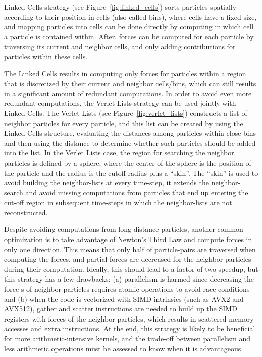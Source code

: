 \documentclass[Afour,sageh,times]{sagej}
\newcommand{\RMchange}[1]{{\color{blue} #1}}
\begin{document}
Linked Cells strategy (see Figure~\ref{fig:linked_cells}) sorts particles spatially according to their position in cells (also called bins), where cells have a fixed size, and mapping particles into cells can be done directly by computing in which cell a particle is contained within.
After, forces can be computed for each particle by traversing its current and neighbor cells, and only adding contributions for particles within these cells.

The Linked Cells results in computing only forces for particles within a region that is discretized by their current and neighbor cells/bins, which can still results in a significant amount of redundant computations.
In order to avoid even more redundant computations, the Verlet Lists strategy can be used jointly with Linked Cells.
The Verlet Lists (see Figure~\ref{fig:verlet_lists}) constructs a list of neighbor particles for every particle, and this list can be created by using the Linked Cells structure, evaluating the distances among particles within close bins and then using the distance to determine whether such particles should be added into the list.
In the Verlet Lists case, the region for searching the neighbor particles is defined by a sphere, where the center of the sphere is the position of the particle and the radius is the cutoff radius plus a ``skin''.
The ``skin'' is used to avoid building the neighbor-lists at every time-step, it extends the neighbor-search and avoid missing computations from particles that end up entering the cut-off region in subsequent time-steps in which the neighbor-lists are not reconstructed.

Despite avoiding computations from long-distance particles, another common optimization is to take advantage of Newton's Third Law and compute forces in only one direction.
This means that only half of particle-pairs are traversed when computing the forces, and partial forces are decreased for the neighbor particles during their computation.
Ideally, this should lead to a factor of two speedup, but this strategy has a few drawbacks: (a) parallelism is harmed since decreasing \RMchange{the} force\RMchange{s} of neighbor particles requires atomic operations to avoid race conditions and (b) when the code is vectorized with SIMD intrinsics (such as AVX2 and AVX512), gather and scatter instructions are needed to build up the SIMD registers with forces of the neighbor particles, which results in scattered memory accesses and extra instructions.
At the end, this strategy is likely to be beneficial for more arithmetic-intensive kernels, and the trade-off between parallelism and less arithmetic operations must be assessed to know when it is advantageous.
\end{document}

